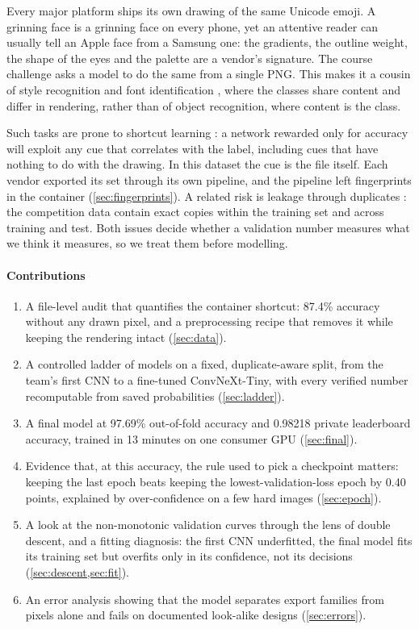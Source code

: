 \documentclass[11pt,a4paper]{article}
\newcommand{\pct}[1]{#1\%}
\begin{document}
Every major platform ships its own drawing of the same Unicode emoji. A grinning face is a grinning face on every phone, yet an attentive reader can usually tell an Apple face from a Samsung one: the gradients, the outline weight, the shape of the eyes and the palette are a vendor's signature. The course challenge asks a model to do the same from a single PNG. This makes it a cousin of style recognition \cite{karayev2014style} and font identification \cite{wang2015deepfont}, where the classes share content and differ in rendering, rather than of object recognition, where content is the class.

Such tasks are prone to shortcut learning \cite{geirhos2020shortcut}: a network rewarded only for accuracy will exploit any cue that correlates with the label, including cues that have nothing to do with the drawing. In this dataset the cue is the file itself. Each vendor exported its set through its own pipeline, and the pipeline left fingerprints in the container (\cref{sec:fingerprints}). A related risk is leakage through duplicates \cite{kaufman2012leakage,barz2020cifair}: the competition data contain exact copies within the training set and across training and test. Both issues decide whether a validation number measures what we think it measures, so we treat them before modelling.

\paragraph{Contributions}
\begin{enumerate}[leftmargin=1.4em]
  \item A file-level audit that quantifies the container shortcut: \pct{87.4} accuracy without any drawn pixel, and a preprocessing recipe that removes it while keeping the rendering intact (\cref{sec:data}).
  \item A controlled ladder of models on a fixed, duplicate-aware split, from the team's first CNN to a fine-tuned ConvNeXt-Tiny, with every verified number recomputable from saved probabilities (\cref{sec:ladder}).
  \item A final model at \pct{97.69} out-of-fold accuracy and 0.98218 private leaderboard accuracy, trained in 13 minutes on one consumer GPU (\cref{sec:final}).
  \item Evidence that, at this accuracy, the rule used to pick a checkpoint matters: keeping the last epoch beats keeping the lowest-validation-loss epoch by 0.40 points, explained by over-confidence on a few hard images (\cref{sec:epoch}).
  \item A look at the non-monotonic validation curves through the lens of double descent, and a fitting diagnosis: the first CNN underfitted, the final model fits its training set but overfits only in its confidence, not its decisions (\cref{sec:descent,sec:fit}).
  \item An error analysis showing that the model separates export families from pixels alone and fails on documented look-alike designs (\cref{sec:errors}).
\end{enumerate}
\end{document}
